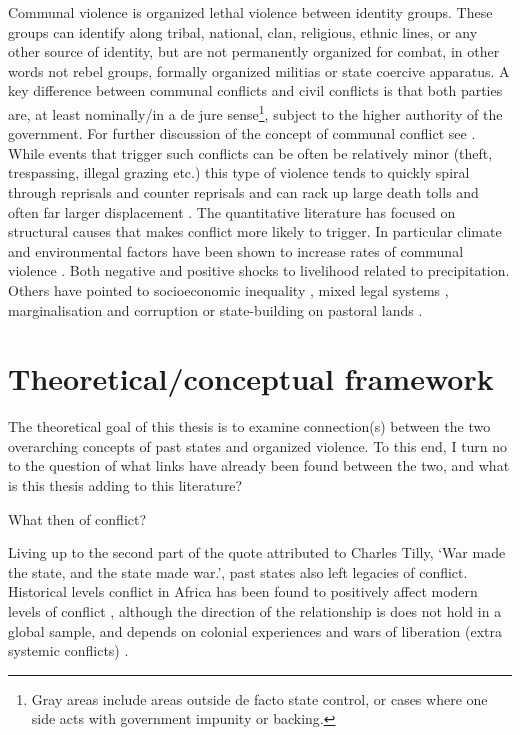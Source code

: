 \documentclass[12pt]{article}
\begin{document}
 Communal violence is organized lethal violence between identity groups. These
 groups can identify along tribal, national, clan, religious, ethnic lines, or
 any other source of identity, but are not permanently organized for combat, in
 other words not rebel groups, formally organized militias or state coercive
 apparatus. A key difference between communal conflicts and civil conflicts is
 that both parties are, at least nominally/in a de jure sense\footnote{Gray
	 areas include areas outside de facto state control, or cases where one
 side acts with government impunity or backing.}, subject to the higher
 authority of the government. For further discussion of the concept of communal
 conflict see \citet{BroscheJohan2012Cccw}. While events that trigger such
 conflicts can be often be relatively minor (theft, trespassing, illegal
 grazing etc.) this type of violence tends to quickly spiral through reprisals
 and counter reprisals and can rack up large death tolls and often far larger
 displacement \citep{Horowitz_2001}. The quantitative literature has focused on
 structural causes that makes conflict more likely to trigger. In particular
 climate and environmental factors have been shown to increase rates of
communal violence \citep{Turner_2011}. Both negative \citep{Detges_2017,
Fjelde2012, van_Weezel_2019, Petrova_2022} and positive \citep{Theisen2012,
Witsenburg2012} shocks to livelihood related to precipitation. Others have
pointed to socioeconomic inequality \citep{Fjelde2014, PETERS_2004}, mixed legal
systems \citep{Eck2014}, marginalisation and corruption \citep{BENJAMINSEN_2009}
or state-building on pastoral lands \citep{hagmann2008pastoral}.

\section{Theoretical/conceptual framework}
\label{Theoretical/conceptual framework}

The theoretical goal of this thesis is to examine connection(s) between the two
overarching concepts of past states and organized violence. To this end, I turn
no to the question of what links have already been found between the two, and
what is this thesis adding to this literature? 


What then of conflict?

Living up to the second part of the quote attributed to Charles Tilly, `War
made the state, and the state made war.', past states also left legacies of
conflict. Historical levels conflict in Africa has been found to positively
affect modern levels of conflict \citep{Besley2014}, although the direction of
the relationship is does not hold in a global sample, and depends on colonial
experiences and wars of liberation (extra systemic conflicts)
\citep{Fearon2014}. 
\end{document}
